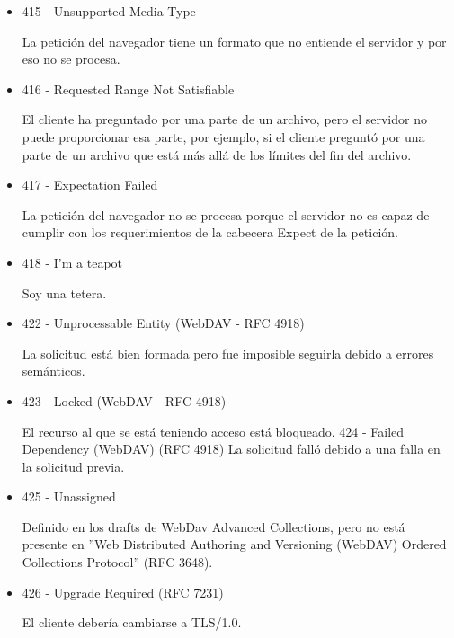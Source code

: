 \documentclass[a4paper,10pt]{article}
\begin{document}
\begin{enumerate}
\begin{enumerate}
\begin{itemize}
\begin{itemize}
                            \item 415 - Unsupported Media Type

                            La petición del navegador tiene un formato que no entiende el servidor y por eso no se procesa.

                            \item 416 - Requested Range Not Satisfiable

                            El cliente ha preguntado por una parte de un archivo, pero el servidor no puede proporcionar esa parte, por ejemplo, si el cliente preguntó por una parte de un archivo que está más allá de los límites del fin del archivo.

                            \item 417 - Expectation Failed

                            La petición del navegador no se procesa porque el servidor no es capaz de cumplir con los requerimientos de la cabecera Expect de la petición.

                            \item 418 - I’m a teapot

                            Soy una tetera.

                            \item 422 - Unprocessable Entity (WebDAV - RFC 4918)

                            La solicitud está bien formada pero fue imposible seguirla debido a errores semánticos.

                            \item 423 - Locked (WebDAV - RFC 4918)

                            El recurso al que se está teniendo acceso está bloqueado. 424 - Failed Dependency (WebDAV) (RFC 4918) La solicitud falló debido a una falla en la solicitud previa.

                            \item 425 - Unassigned

                            Definido en los drafts de WebDav Advanced Collections, pero no está presente en ”Web Distributed Authoring and Versioning (WebDAV) Ordered Collections Protocol” (RFC 3648).

                            \item 426 - Upgrade Required (RFC 7231)

                            El cliente debería cambiarse a TLS/1.0.


\end{itemize}
\end{itemize}
\end{enumerate}
\end{enumerate}
\end{document}
